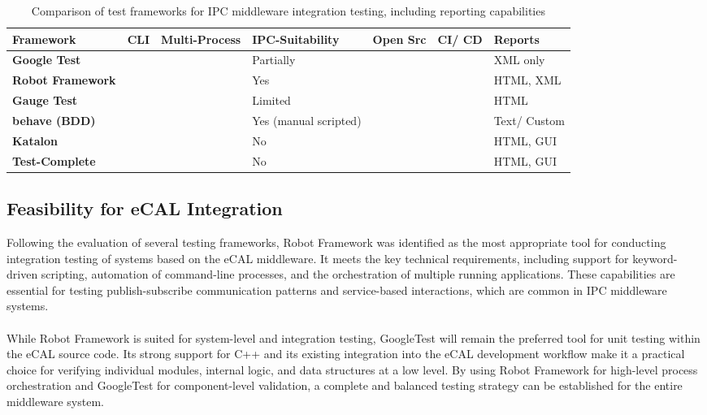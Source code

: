 \begin{table}[H]
	\centering
	\renewcommand{\arraystretch}{1.4}
	\begin{tabular}{|p{2.31cm}|p{1cm}|p{1.7cm}|p{2.1cm}|p{1cm}|p{1cm}|p{1.7cm}|}
		\hline
		\textbf{Framework} & \textbf{CLI} & \textbf{Multi-Process} & \textbf{IPC-Suitability} & \textbf{Open Src} & \textbf{CI/ CD} & \textbf{Reports} \\
		\hline
		\textbf{Google Test}         & \cmark & \xmark  & Partially               & \cmark & \cmark & XML only \\
		\hline
		\textbf{Robot Framework}     & \cmark & \cmark  & Yes                     & \cmark & \cmark & HTML, XML \\
		\hline
		\textbf{Gauge Test}          & \cmark & \xmark  & Limited                 & \cmark & \cmark & HTML \\
		\hline
		\textbf{behave (BDD)}        & \cmark & \xmark  & Yes (manual scripted)            & \cmark & \cmark & Text/ Custom \\
		\hline
		\textbf{Katalon}             & \xmark & \xmark  & No                      & \xmark & \xmark & HTML, GUI \\
		\hline
		\textbf{Test-Complete}        & \xmark & \xmark  & No                      & \xmark & \xmark & HTML, GUI \\
		\hline
	\end{tabular}
	\caption{Comparison of test frameworks for IPC middleware integration testing, including reporting capabilities}
	\label{tab:framework_comparison_reporting}
\end{table}


\subsection{Feasibility for eCAL Integration}

Following the evaluation of several testing frameworks, Robot Framework was identified as the most appropriate tool for conducting integration testing of systems based on the eCAL middleware. It meets the key technical requirements, including support for keyword-driven scripting, automation of command-line processes, and the orchestration of multiple running applications. These capabilities are essential for testing publish-subscribe communication patterns and service-based interactions, which are common in IPC middleware systems.
\\
\\
While Robot Framework is suited for system-level and integration testing, GoogleTest will remain the preferred tool for unit testing within the eCAL source code. Its strong support for C++ and its existing integration into the eCAL development workflow make it a practical choice for verifying individual modules, internal logic, and data structures at a low level. By using Robot Framework for high-level process orchestration and GoogleTest for component-level validation, a complete and balanced testing strategy can be established for the entire middleware system.

